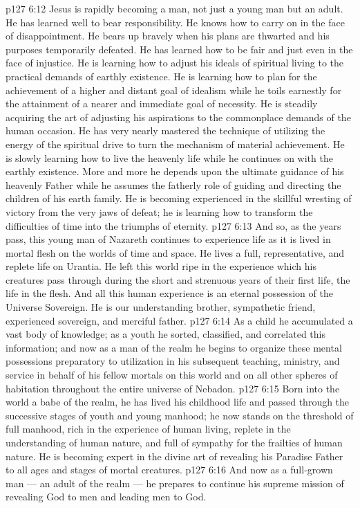 \vs p127 6:12 \pc Jesus is rapidly becoming a man, not just a young man but an adult. He has learned well to bear responsibility. He knows how to carry on in the face of disappointment. He bears up bravely when his plans are thwarted and his purposes temporarily defeated. He has learned how to be fair and just even in the face of injustice. He is learning how to adjust his ideals of spiritual living to the practical demands of earthly existence. He is learning how to plan for the achievement of a higher and distant goal of idealism while he toils earnestly for the attainment of a nearer and immediate goal of necessity. He is steadily acquiring the art of adjusting his aspirations to the commonplace demands of the human occasion. He has very nearly mastered the technique of utilizing the energy of the spiritual drive to turn the mechanism of material achievement. He is slowly learning how to live the heavenly life while he continues on with the earthly existence. More and more he depends upon the ultimate guidance of his heavenly Father while he assumes the fatherly role of guiding and directing the children of his earth family. He is becoming experienced in the skillful wresting of victory from the very jaws of defeat; he is learning how to transform the difficulties of time into the triumphs of eternity.
\vs p127 6:13 \pc And so, as the years pass, this young man of Nazareth continues to experience life as it is lived in mortal flesh on the worlds of time and space. He lives a full, representative, and replete life on Urantia. He left this world ripe in the experience which his creatures pass through during the short and strenuous years of their first life, the life in the flesh. And all this human experience is an eternal possession of the Universe Sovereign. He is our understanding brother, sympathetic friend, experienced sovereign, and merciful father.
\vs p127 6:14 As a child he accumulated a vast body of knowledge; as a youth he sorted, classified, and correlated this information; and now as a man of the realm he begins to organize these mental possessions preparatory to utilization in his subsequent teaching, ministry, and service in behalf of his fellow mortals on this world and on all other spheres of habitation throughout the entire universe of Nebadon.
\vs p127 6:15 Born into the world a babe of the realm, he has lived his childhood life and passed through the successive stages of youth and young manhood; he now stands on the threshold of full manhood, rich in the experience of human living, replete in the understanding of human nature, and full of sympathy for the frailties of human nature. He is becoming expert in the divine art of revealing his Paradise Father to all ages and stages of mortal creatures.
\vs p127 6:16 And now as a full\hyp{}grown man --- an adult of the realm --- he prepares to continue his supreme mission of revealing God to men and leading men to God.
\quizlink
